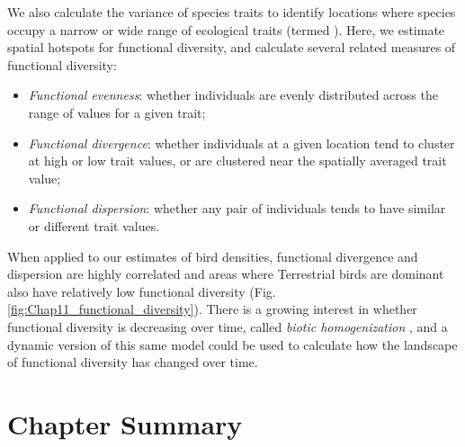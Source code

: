 We also calculate the variance of species traits to identify locations where species occupy a narrow or wide range of ecological traits (termed ).  Here, we estimate spatial hotspots for functional diversity, and calculate several related measures of functional diversity:
\begin{itemize}
    \item \textit{Functional evenness}:  whether individuals are evenly distributed across the range of values for a given trait;
    
    \item \textit{Functional divergence}:  whether individuals at a given location tend to cluster at high or low trait values, or are clustered near the spatially averaged trait value;

    \item \textit{Functional dispersion}:  whether any pair of individuals tends to have similar or different trait values.
\end{itemize}
When applied to our estimates of bird densities, functional divergence and dispersion are highly correlated and areas where Terrestrial birds are dominant also have relatively low functional diversity (Fig. \ref{fig:Chap11_functional_diversity}). There is a growing interest in whether functional diversity is decreasing over time, called \textit{biotic homogenization} \cite{clavel_worldwide_2011}, and a dynamic version of this same model could be used to calculate how the landscape of functional diversity has changed over time.  

\section{Chapter Summary}

